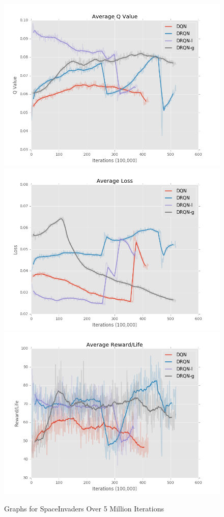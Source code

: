 \documentclass{article}
\begin{document}
\begin{figure}[h]
    \centering
    \begin{minipage}{1.0\textwidth}
        \centering
        \includegraphics[scale=0.2]{SpaceInvaders1}
        \centering
        \includegraphics[scale=0.2]{SpaceInvaders2}
        \centering
        \includegraphics[scale=0.2]{SpaceInvaders3}
    \end{minipage}
    \caption{Graphs for SpaceInvaders Over 5 Million Iterations}
\end{figure}
\end{document}
